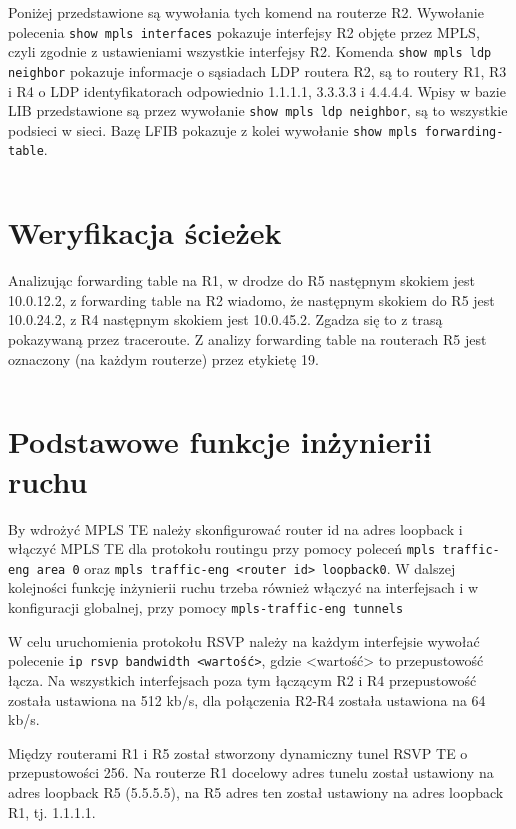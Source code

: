 \documentclass[a4paper,12pt,notitlepage]{article}
\begin{document}
Poniżej przedstawione są wywołania tych komend na routerze R2. Wywołanie polecenia \texttt{show mpls interfaces} pokazuje interfejsy R2 objęte przez MPLS, czyli zgodnie z ustawieniami wszystkie interfejsy R2. Komenda \texttt{show mpls ldp neighbor} pokazuje informacje o sąsiadach LDP routera R2, są to routery R1, R3 i R4 o LDP identyfikatorach odpowiednio 1.1.1.1, 3.3.3.3 i 4.4.4.4. Wpisy w bazie LIB przedstawione są przez wywołanie \texttt{show mpls ldp neighbor}, są to wszystkie podsieci w sieci. Bazę LFIB pokazuje z kolei wywołanie \texttt{show mpls forwarding-table}.
\inputminted[label=Weryfikacja MPLS/LDP na R2, firstline=204, lastline=307]{text}{R/R2.txt}

\section{Weryfikacja ścieżek}

Analizując forwarding table na R1, w drodze do R5 następnym skokiem jest 10.0.12.2, z forwarding table na R2 wiadomo, że następnym skokiem do R5 jest 10.0.24.2, z R4 następnym skokiem jest 10.0.45.2. Zgadza się to z trasą pokazywaną przez traceroute. Z analizy forwarding table na routerach R5 jest oznaczony (na każdym routerze) przez etykietę 19.
\inputminted[label=Forwarding table R1, firstline=253, lastline=272]{text}{R/R1.txt}

\section{Podstawowe funkcje inżynierii ruchu}

By wdrożyć MPLS TE należy skonfigurować router id na adres loopback i włączyć MPLS TE dla protokołu routingu przy pomocy poleceń \texttt{mpls traffic-eng area 0} oraz \texttt{mpls traffic-eng <router id> loopback0}. W dalszej kolejności funkcję inżynierii ruchu trzeba również włączyć na interfejsach i w konfiguracji globalnej, przy pomocy \texttt{mpls-traffic-eng tunnels}

W celu uruchomienia protokołu RSVP należy na każdym interfejsie wywołać polecenie \texttt{ip rsvp bandwidth <wartość>}, gdzie <wartość> to przepustowość łącza. Na wszystkich interfejsach poza tym łączącym R2 i R4 przepustowość została ustawiona na 512 kb/s, dla połączenia R2-R4 została ustawiona na 64 kb/s.

Między routerami R1 i R5 został stworzony dynamiczny tunel RSVP TE o przepustowości 256. Na routerze R1 docelowy adres tunelu został ustawiony na adres loopback R5 (5.5.5.5), na R5 adres ten został ustawiony na adres loopback R1, tj. 1.1.1.1.
\end{document}
